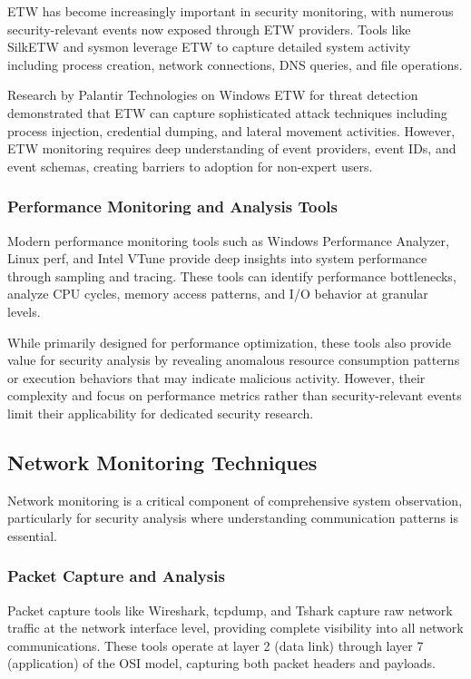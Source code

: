 ETW has become increasingly important in security monitoring, with numerous security-relevant events now exposed through ETW providers. Tools like SilkETW and sysmon leverage ETW to capture detailed system activity including process creation, network connections, DNS queries, and file operations.

Research by Palantir Technologies on Windows ETW for threat detection demonstrated that ETW can capture sophisticated attack techniques including process injection, credential dumping, and lateral movement activities. However, ETW monitoring requires deep understanding of event providers, event IDs, and event schemas, creating barriers to adoption for non-expert users.

\subsubsection{Performance Monitoring and Analysis Tools}
Modern performance monitoring tools such as Windows Performance Analyzer, Linux perf, and Intel VTune provide deep insights into system performance through sampling and tracing. These tools can identify performance bottlenecks, analyze CPU cycles, memory access patterns, and I/O behavior at granular levels.

While primarily designed for performance optimization, these tools also provide value for security analysis by revealing anomalous resource consumption patterns or execution behaviors that may indicate malicious activity. However, their complexity and focus on performance metrics rather than security-relevant events limit their applicability for dedicated security research.

\subsection{Network Monitoring Techniques}

Network monitoring is a critical component of comprehensive system observation, particularly for security analysis where understanding communication patterns is essential.

\subsubsection{Packet Capture and Analysis}
Packet capture tools like Wireshark, tcpdump, and Tshark capture raw network traffic at the network interface level, providing complete visibility into all network communications. These tools operate at layer 2 (data link) through layer 7 (application) of the OSI model, capturing both packet headers and payloads.

